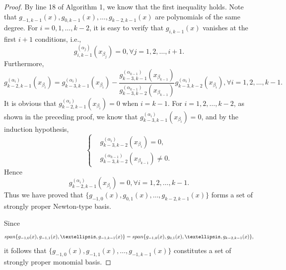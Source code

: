 \documentclass[10pt,a4paper]{amsart}
\begin{document}
\begin{proof}
By line 18 of Algorithm 1, we know that the first inequality holds.
Note that $g_{-1,k-1}(x), g_{0,k-1}(x), \dots, g_{k-2,k-1}(x)$ are polynomials of the same degree. 
For $i=0,1,\dots,k-2$, it is easy to verify that $g_{i,k-1}(x)$ vanishes at the first $i+1$ conditions, i.e.,
\begin{displaymath}
    g_{i,k-1}^{(\alpha_j)}(x_{\beta_j})=0, \forall j=1,2,\dots,i+1.
\end{displaymath}
Furthermore, 
\begin{displaymath}
    g_{k-2,k-1}^{(\alpha_i)}(x_{\beta_i})=g_{k-3,k-1}^{(\alpha_i)}(x_{\beta_i})-\frac{g_{k-3,k-1}^{(\alpha_{k-1})}(x_{\beta_{k-1}})}{g_{k-3,k-2}^{(\alpha_{k-1})}(x_{\beta_{k-1}})}g_{k-3,k-2}^{(\alpha_i)}(x_{\beta_i}),  \forall i=1,2,\dots,k-1.
\end{displaymath}
It is obvious that $g_{k-2,k-1}^{(\alpha_i)}(x_{\beta_i})=0$ when $i=k-1$. For $i=1,2,\dots,k-2$, as shown in the preceding proof, we know that 
$g_{k-3,k-1}^{(\alpha_i)}(x_{\beta_i})=0$, and by the induction hypothesis, \[
\left\{
\begin{aligned}
&g_{k-3,k-2}^{(\alpha_i)}(x_{\beta_i})=0, \\
&g_{k-3,k-2}^{(\alpha_{k-1})}(x_{\beta_{k-1}})\neq 0.
\end{aligned}
\right.
\] 
Hence
\begin{displaymath}
    g_{k-2,k-1}^{(\alpha_i)}(x_{\beta_i})=0, \forall i=1,2,\dots,k-1.
\end{displaymath} Thus we have proved that $\{g_{-1,0}(x), g_{0,1}(x), \dots, g_{k-2,k-1}(x)\}$ forms a set of strongly proper Newton-type basis.

Since $$\textup{span}\{g_{-1,0}(x), g_{-1,1}(x), \dots, g_{-1,k-1}(x)\}=\textup{span}\{g_{-1,0}(x),g_{0,1}(x),\dots,g_{k-2,k-1}(x)\},$$ 
it follows that
$\{g_{-1,0}(x), g_{-1,1}(x), \dots, g_{-1,k-1}(x)\}$ constitutes a set of strongly proper monomial basis.
\end{proof}
\end{document}
